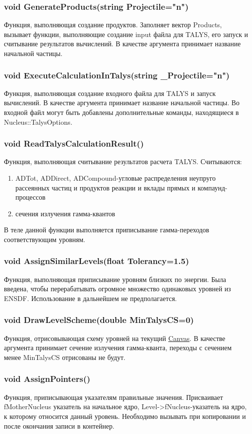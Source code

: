 \documentclass[a4paper,12pt]{extarticle}
\begin{document}
\subsubsection{void GenerateProducts(string Projectile="n")}
Функция, выполняющая создание продуктов. Заполняет вектор Products, вызывает функции, выполняющие создание input файла для TALYS, его запуск и считывание результатов вычислений. В качестве аргумента принимает название начальной частицы.
\subsubsection{void ExecuteCalculationInTalys(string _Projectile="n")}
Функция, выполняющая создание входного файла для TALYS и запуск вычислений. В качестве аргумента принимает название начальной частицы. Во входной файл могут быть добавлены дополнительные команды, находящиеся в Nucleus::TalysOptions.
\subsubsection{void ReadTalysCalculationResult()}
Функция, выполняющая считывание результатов расчета TALYS. Считываются:
\begin{enumerate}
\item ADTot, ADDirect, ADCompound-угловые распределения неупруго рассеянных частиц и продуктов реакции и вклады прямых и компаунд-процессов
\item сечения излучения гамма-квантов
\end{enumerate} 
В теле данной функции выполняется приписывание гамма-переходов соответствующим уровням.
\subsubsection{void AssignSimilarLevels(float Tolerancy=1.5)}
Функция, выполняющая приписывание уровням близких по энергии. Была введена, чтобы перерабатывать огромное множество одинаковых уровней из ENSDF. Использование в дальнейшем не предполагается.
\subsubsection{void DrawLevelScheme(double MinTalysCS=0)}
Функция, отрисовывающая схему уровней на текущий \href{https://root.cern.ch/doc/master/classTCanvas.html}{Canvas}. В качестве аргумента принимает сечение излучения гамма-кванта, переходы с сечением менее MinTalysCS отрисованы не будут.
\subsubsection{void AssignPointers()}
Функция, приписывающая указателям правильные значения. Присваивает fMotherNucleus указатель на начальное ядро, Level->fNucleus-указатель на ядро, к которому относится данный уровень. Необходимо вызывать при копировании и после окончания записи в контейнер.
\end{document}
